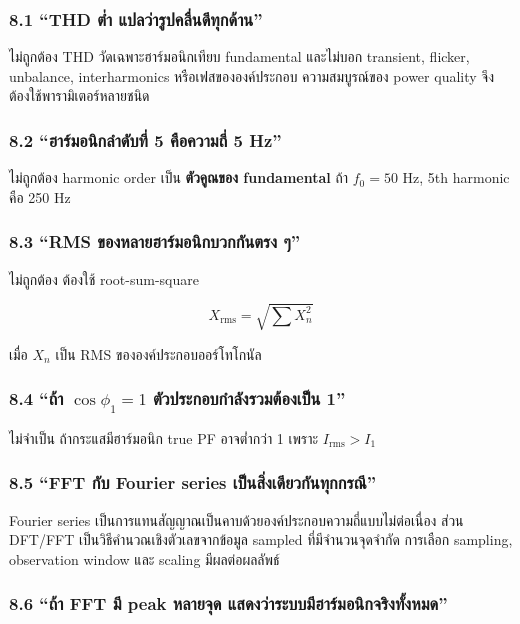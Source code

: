 \subsubsection{8.1 “THD ต่ำ แปลว่ารูปคลื่นดีทุกด้าน”}

ไม่ถูกต้อง THD วัดเฉพาะฮาร์มอนิกเทียบ fundamental และไม่บอก transient, flicker, unbalance, interharmonics หรือเฟสขององค์ประกอบ ความสมบูรณ์ของ power quality จึงต้องใช้พารามิเตอร์หลายชนิด

\subsubsection{8.2 “ฮาร์มอนิกลำดับที่ 5 คือความถี่ 5 Hz”}

ไม่ถูกต้อง harmonic order เป็น \textbf{ตัวคูณของ fundamental} ถ้า $f_0=50$ Hz, 5th harmonic คือ 250 Hz

\subsubsection{8.3 “RMS ของหลายฮาร์มอนิกบวกกันตรง ๆ”}

ไม่ถูกต้อง ต้องใช้ root-sum-square

\[
X_{\mathrm{rms}}=\sqrt{\sum X_n^2}
\]

เมื่อ $X_n$ เป็น RMS ขององค์ประกอบออร์โทโกนัล

\subsubsection[8.4 ถ้า cos phi1 = 1 ตัวประกอบกำลังรวมต้องเป็น 1]{8.4 “ถ้า $\cos\phi_1=1$ ตัวประกอบกำลังรวมต้องเป็น 1”}

ไม่จำเป็น ถ้ากระแสมีฮาร์มอนิก true PF อาจต่ำกว่า 1 เพราะ $I_{\mathrm{rms}}>I_1$

\subsubsection{8.5 “FFT กับ Fourier series เป็นสิ่งเดียวกันทุกกรณี”}

Fourier series เป็นการแทนสัญญาณเป็นคาบด้วยองค์ประกอบความถี่แบบไม่ต่อเนื่อง ส่วน DFT/FFT เป็นวิธีคำนวณเชิงตัวเลขจากข้อมูล sampled ที่มีจำนวนจุดจำกัด การเลือก sampling, observation window และ scaling มีผลต่อผลลัพธ์

\subsubsection{8.6 “ถ้า FFT มี peak หลายจุด แสดงว่าระบบมีฮาร์มอนิกจริงทั้งหมด”}

